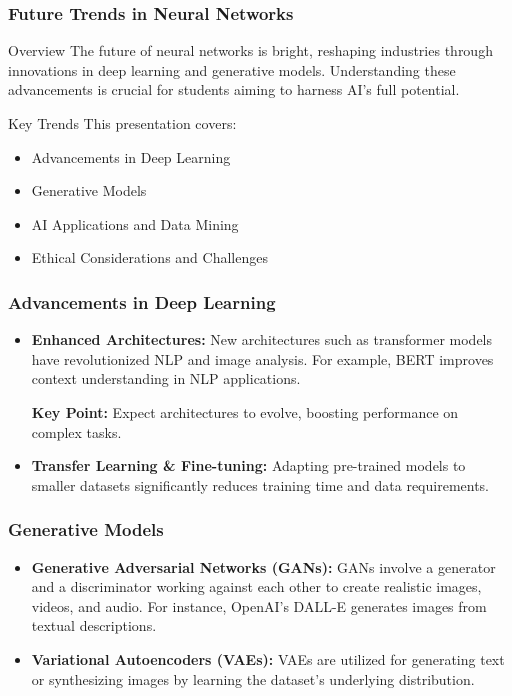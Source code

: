 \documentclass[aspectratio=169]{beamer}
\begin{document}
\begin{frame}[fragile]
    \frametitle{Future Trends in Neural Networks}
    \begin{block}{Overview}
        The future of neural networks is bright, reshaping industries through innovations in deep learning and generative models. Understanding these advancements is crucial for students aiming to harness AI's full potential.
    \end{block}
    \begin{block}{Key Trends}
        This presentation covers:
        \begin{itemize}
            \item Advancements in Deep Learning
            \item Generative Models
            \item AI Applications and Data Mining
            \item Ethical Considerations and Challenges
        \end{itemize}
    \end{block}
\end{frame}

\begin{frame}[fragile]
    \frametitle{Advancements in Deep Learning}
    \begin{itemize}
        \item \textbf{Enhanced Architectures:} 
          New architectures such as transformer models have revolutionized NLP and image analysis. For example, BERT improves context understanding in NLP applications.
          
          \textbf{Key Point:} Expect architectures to evolve, boosting performance on complex tasks.
          
        \item \textbf{Transfer Learning \& Fine-tuning:}
          Adapting pre-trained models to smaller datasets significantly reduces training time and data requirements.
    \end{itemize}
\end{frame}

\begin{frame}[fragile]
    \frametitle{Generative Models}
    \begin{itemize}
        \item \textbf{Generative Adversarial Networks (GANs):} 
          GANs involve a generator and a discriminator working against each other to create realistic images, videos, and audio. For instance, OpenAI's DALL-E generates images from textual descriptions.
          
        \item \textbf{Variational Autoencoders (VAEs):} 
          VAEs are utilized for generating text or synthesizing images by learning the dataset's underlying distribution.
    \end{itemize}
\end{frame}
\end{document}
